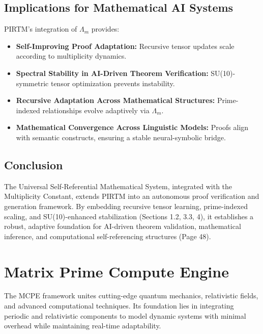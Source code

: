 \documentclass{article}
\theoremstyle{plain}
\begin{document}
\subsection{Implications for Mathematical AI Systems}
PIRTM’s integration of \( \Lambda_m \) provides:
\begin{itemize}
    \item \textbf{Self-Improving Proof Adaptation:} Recursive tensor updates scale according to multiplicity dynamics.
    \item \textbf{Spectral Stability in AI-Driven Theorem Verification:} SU(10)-symmetric tensor optimization prevents instability.
    \item \textbf{Recursive Adaptation Across Mathematical Structures:} Prime-indexed relationships evolve adaptively via \( \Lambda_m \).
    \item \textbf{Mathematical Convergence Across Linguistic Models:} Proofs align with semantic constructs, ensuring a stable neural-symbolic bridge.
\end{itemize}

\subsection{Conclusion}
The Universal Self-Referential Mathematical System, integrated with the Multiplicity Constant, extends PIRTM into an autonomous proof verification and generation framework. By embedding recursive tensor learning, prime-indexed scaling, and SU(10)-enhanced stabilization (Sections 1.2, 3.3, 4), it establishes a robust, adaptive foundation for AI-driven theorem validation, mathematical inference, and computational self-referencing structures (Page 48).

\section{Matrix Prime Compute Engine}
The MCPE framework unites cutting-edge quantum mechanics, relativistic fields, and advanced computational techniques. Its foundation lies in integrating periodic and relativistic components to model dynamic systems with minimal overhead while maintaining real-time adaptability.
\end{document}
